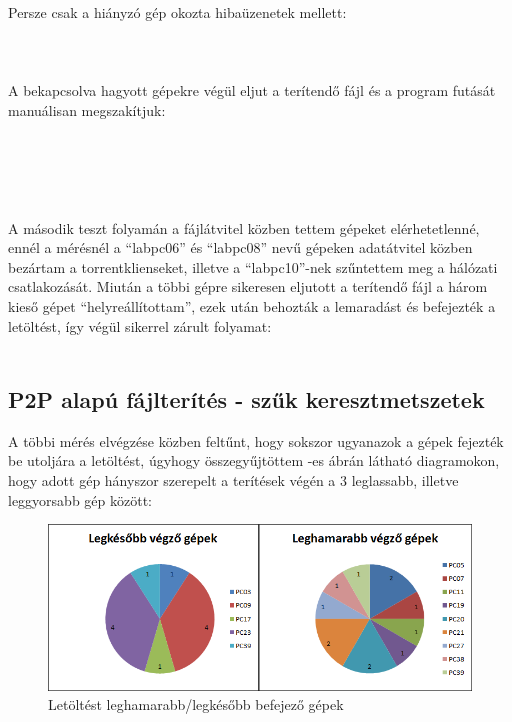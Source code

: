 Persze csak a hiányzó gép okozta hibaüzenetek mellett:\\\\
\\\\
A bekapcsolva hagyott gépekre végül eljut a terítendő fájl és a program futását manuálisan megszakítjuk:\\\\
\\
\\
\\\\
A második teszt folyamán a fájlátvitel közben tettem gépeket elérhetetlenné, ennél a mérésnél a ``labpc06'' és ``labpc08'' nevű gépeken adatátvitel közben bezártam a torrentklienseket, illetve a ``labpc10''-nek szűntettem meg a hálózati csatlakozását. Miután a többi gépre sikeresen eljutott a terítendő fájl a három kieső gépet ``helyreállítottam'', ezek után behozták a lemaradást és befejezték a letöltést, így végül sikerrel zárult folyamat:\\\\

%
\subsection{P2P alapú fájlterítés - szűk keresztmetszetek}
%

A többi mérés elvégzése közben feltűnt, hogy sokszor ugyanazok a gépek fejezték be utoljára a letöltést, úgyhogy összegyűjtöttem -es ábrán látható diagramokon, hogy adott gép hányszor szerepelt a terítések végén a 3 leglassabb, illetve leggyorsabb gép között:


\begin{figure}[ht]
\centering
\includegraphics[width=150mm, keepaspectratio]{figures/Perf_computers.png}
\caption{Letöltést leghamarabb/legkésőbb befejező gépek}
\label{fig:computerdownloadspeeds}
\end{figure}

